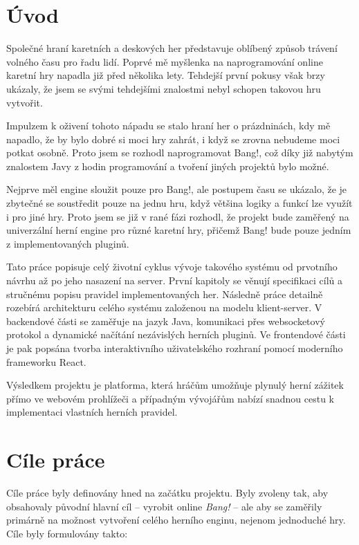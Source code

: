 
\section{Úvod}
Společné hraní karetních a deskových her představuje oblíbený způsob trávení volného času pro řadu lidí. Poprvé mě myšlenka na naprogramování online karetní hry napadla již před několika lety. Tehdejší první pokusy však brzy ukázaly, že jsem se svými tehdejšími znalostmi nebyl schopen takovou hru vytvořit.

Impulzem k oživení tohoto nápadu se stalo hraní her o prázdninách, kdy mě napadlo, že by bylo dobré si moci hry zahrát, i když se zrovna nebudeme moci potkat osobně. Proto jsem se rozhodl naprogramovat Bang!, což díky již nabytým znalostem Javy z hodin programování a tvoření jiných projektů bylo možné.

Nejprve měl engine sloužit pouze pro Bang!, ale postupem času se ukázalo, že je zbytečné se soustředit pouze na jednu hru, když většina logiky a funkcí lze využít i pro jiné hry. Proto jsem se již v rané fázi rozhodl, že projekt bude zaměřený na univerzální herní engine pro různé karetní hry, přičemž Bang! bude pouze jedním z implementovaných pluginů.

Tato práce popisuje celý životní cyklus vývoje takového systému od prvotního návrhu až po jeho nasazení na server. První kapitoly se věnují specifikaci cílů a stručnému popisu pravidel implementovaných her. Následně práce detailně rozebírá architekturu celého systému založenou na modelu klient-server. V backendové části se zaměřuje na jazyk Java, komunikaci přes websocketový protokol a dynamické načítání nezávislých herních pluginů. Ve frontendové části je pak popsána tvorba interaktivního uživatelského rozhraní pomocí moderního frameworku React.

Výsledkem projektu je platforma, která hráčům umožňuje plynulý herní zážitek přímo ve webovém prohlížeči a případným vývojářům nabízí snadnou cestu k implementaci vlastních herních pravidel.

\section{Cíle práce}
Cíle práce byly definovány hned na začátku projektu. Byly zvoleny tak, aby obsahovaly původní hlavní cíl -- vyrobit online \emph{Bang!} -- ale aby se zaměřily primárně na možnost vytvoření celého herního enginu, nejenom jednoduché hry. Cíle byly formulovány takto:

